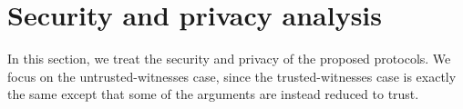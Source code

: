 \section{Security and privacy analysis}%
\label{SecurityAnalysis}

In this section, we treat the security and privacy of the proposed protocols.
We focus on the untrusted-witnesses case, since the trusted-witnesses case is 
exactly the same except that some of the arguments are instead reduced to 
trust.



